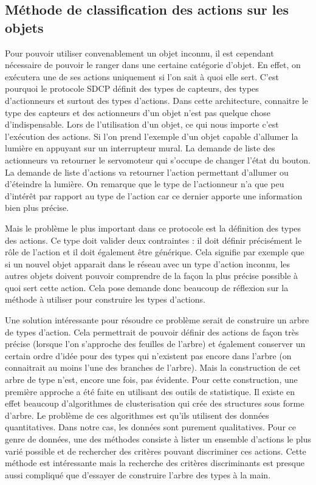	\subsection{Méthode de classification des actions sur les objets}
		Pour pouvoir utiliser convenablement un objet inconnu, il est cependant nécessaire de pouvoir
		le ranger dans une certaine catégorie d'objet. En effet, on exécutera une de ses actions 
		uniquement si l'on sait à quoi elle sert. C'est pourquoi le protocole SDCP définit des types
		de capteurs, des types d'actionneurs et surtout des types d'actions. Dans cette architecture,
		connaitre le type des capteurs et des actionneurs d'un objet n'est pas quelque chose 
		d'indispensable. Lors de l'utilisation d'un objet, ce qui nous importe c'est l'exécution 
		des actions. Si l'on prend l'exemple d'un objet capable d'allumer la lumière en appuyant 
		sur un interrupteur mural. La demande de liste des actionneurs va retourner le servomoteur
		qui s'occupe de changer l'état du bouton. La demande de liste d'actions va retourner l'action
		permettant d'allumer ou d'éteindre la lumière. On remarque que le type de l'actionneur n'a
		que peu d'intérêt par rapport au type de l'action car ce dernier apporte une information bien
		plus précise.
		
		Mais le problème le plus important dans ce protocole est la définition des types des actions.
		Ce type doit valider deux contraintes : il doit définir précisément le rôle de l'action et
		il doit également être générique. Cela signifie par exemple que si un nouvel objet
		apparait dans le réseau avec un type d'action inconnu, les autres objets doivent pouvoir 
		comprendre de la façon la plus précise possible à quoi sert cette action. Cela pose demande
		donc beaucoup de réflexion sur la méthode à utiliser pour construire les types d'actions.
		
		Une solution intéressante pour résoudre ce problème serait de construire un arbre de types
		d'action. Cela permettrait de pouvoir définir des actions de façon très précise (lorsque l'on
		s'approche des feuilles de l'arbre) et également conserver un certain ordre d'idée pour 
		des types qui n'existent pas encore dans l'arbre (on connaitrait au moins l'une des branches de
		l'arbre). Mais la construction de cet arbre de type n'est, encore une fois, pas évidente.
		Pour cette construction, une première approche a été faite en utilisant des outils de
		statistique. Il existe en effet beaucoup d'algorithmes de clusterisation qui crée des
		structures sous forme d'arbre. Le problème de ces algorithmes est qu'ils utilisent des données
		quantitatives. Dans notre cas, les données sont purement qualitatives. Pour ce genre de
		données, une des méthodes consiste à lister un ensemble d'actions le plus varié possible et
		de rechercher des critères pouvant discriminer ces actions. Cette méthode est intéressante 
mais
 		la recherche des critères discriminants est presque aussi compliqué que d'essayer de 
construire
		l'arbre des types à la main.
		
